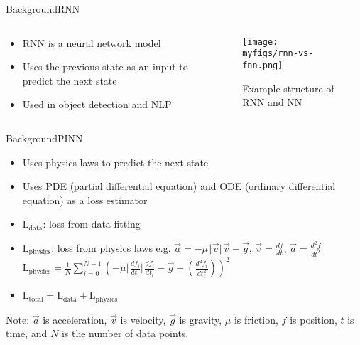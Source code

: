 \documentclass[
	aspectratio=169,	%
	onlytextwidth,		%
	t,					%
	]{beamer}
\begin{document}
\begin{frame}[fragile]{Background}{RNN}
	\begin{columns}
		\begin{column}[T]{.33\textwidth}

			\begin{itemize}
				\item<1-> RNN is a neural network model
				\item<2-> Uses the previous state as an input to predict the next state
				\item<3-> Used in object detection and NLP
			\end{itemize}

		\end{column}

		\begin{column}[T]{.66\textwidth}
			\begin{figure}
				\texttt{[image: myfigs/rnn-vs-fnn.png]}
				\caption{Example structure of RNN and NN~\cite{rnnpic}}
			\end{figure}

		\end{column}

	\end{columns}
\end{frame}

\begin{frame}[fragile]{Background}{PINN}

	\begin{itemize}

		\item<1-> Uses physics laws to predict the next state
		\item<2-> Uses PDE (partial differential equation) and ODE (ordinary differential equation) as a loss estimator
		\item<3-> $\text{L}_{\text{data}}$: loss from data fitting
		\item<4-> $\text{L}_{\text{physics}}$: loss from physics laws \newline
			e.g. $\vec{a}= -\mu\Vert\vec{v}\Vert\vec{v} - \vec{g}$, $\vec{v} = \frac{df}{dt}$, $\vec{a}= \frac{d^{2}f}{dt^{2}}$ \newline \vfill
			$\text{L}_{\text{physics}} = \frac{1}{N}\sum_{i=0}^{N-1} \left(-\mu\Vert\frac{df_{i}}{dt_{i}}\Vert\frac{df_{i}}{dt_{i}} - \vec{g} - \left(\frac{d^{2}f_{i}}{dt_{i}^{2}}\right)\right)^{2}$
		\item<5-> $\text{L}_{\text{total}} = \text{L}_{\text{data}} + \text{L}_{\text{physics}}$

	\end{itemize}
	\vfill
	Note: $\vec{a}$ is acceleration, $\vec{v}$ is velocity, $\vec{g}$ is gravity, $\mu$ is friction, $f$ is position, $t$ is time, and $N$ is the number of data points.

\end{frame}
\end{document}
